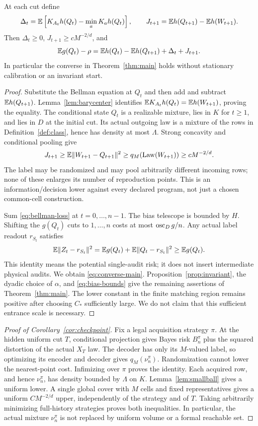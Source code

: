 \begin{proposition}\label{prop:all-observer}
At each cut define
\[
 \Delta_t=\mathbb E\left[K_{A_t}h(Q_t)-\min_a K_ah(Q_t)\right],\qquad
 J_{t+1}=\mathbb E h(Q_{t+1})-\mathbb E h(W_{t+1}).
\]
Then $\Delta_t\ge0$, $J_{t+1}\ge cM^{-2/d}$, and
\begin{equation}\label{eq:bellman-loss}
 \mathbb E g(Q_t)-\rho
 =\mathbb E h(Q_t)-\mathbb E h(Q_{t+1})+\Delta_t+J_{t+1}.
\end{equation}
In particular the converse in Theorem~\ref{thm:main} holds without stationary calibration or an invariant start.
\end{proposition}
\begin{proof}
Substitute the Bellman equation at $Q_t$ and then add and subtract $\mathbb E h(Q_{t+1})$. Lemma~\ref{lem:barycenter} identifies $\mathbb E K_{A_t}h(Q_t)=\mathbb E h(W_{t+1})$, proving the equality. The conditional state $Q_t$ is a realizable mixture, lies in $K$ for $t\ge1$, and lies in $D$ at the initial cut. Its actual outgoing law is a mixture of the rows in Definition~\ref{def:class}, hence has density at most $\Lambda$. Strong concavity and conditional pooling give
\[
 J_{t+1}\ge\mathbb E\lVert W_{t+1}-Q_{t+1}\rVert^2
 \ge q_M(\operatorname{Law}(W_{t+1}))\ge cM^{-2/d}.
\]
The label may be randomized and may pool arbitrarily different incoming rows; none of these enlarges its number of reproduction points. This is an information/decision lower against every declared program, not just a chosen common-cell construction.

Sum \eqref{eq:bellman-loss} at $t=0,\ldots,n-1$. The bias telescope is bounded by $H$. Shifting the $g(Q_t)$ cuts to $1,\ldots,n$ costs at most $\operatorname{osc}_Dg/n$. Any actual label readout $r_{S_t}$ satisfies
\[
 \mathbb E\lVert Z_t-r_{S_t}\rVert^2=\mathbb E g(Q_t)+\mathbb E\lVert Q_t-r_{S_t}\rVert^2\ge\mathbb E g(Q_t).
\]
This identity means the potential single-audit risk; it does not insert intermediate physical audits. We obtain \eqref{eq:converse-main}. Proposition~\ref{prop:invariant}, the dyadic choice of $\alpha$, and \eqref{eq:bias-bounds} give the remaining assertions of Theorem~\ref{thm:main}. The lower constant in the finite matching region remains positive after choosing $C_*$ sufficiently large. We do not claim that this sufficient entrance scale is necessary.
\end{proof}

\begin{proof}[Proof of Corollary~\ref{cor:checkpoint}]
Fix a legal acquisition strategy $\pi$. At the hidden uniform cut $T$, conditional projection gives Bayes risk $B_n^\pi$ plus the squared distortion of the actual $X_T$ law. The decoder has only its $M$-valued label, so optimizing its encoder and decoder gives $q_M(\nu_n^\pi)$. Randomization cannot lower the nearest-point cost. Infimizing over $\pi$ proves the identity. Each acquired row, and hence $\nu_n^\pi$, has density bounded by $\Lambda$ on $K$. Lemma~\ref{lem:smallball} gives a uniform lower. A single global cover with $M$ cells and fixed representatives gives a uniform $CM^{-2/d}$ upper, independently of the strategy and of $T$. Taking arbitrarily minimizing full-history strategies proves both inequalities. In particular, the actual mixture $\nu_n^\pi$ is not replaced by uniform volume or a formal reachable set.
\end{proof}
